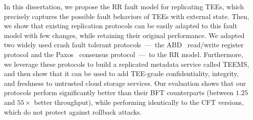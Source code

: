 \noindent In this dissertation, we propose the \acf{RR} fault
model for replicating \acp{TEE}, which precisely captures the possible
fault behaviors of \acp{TEE} with external state. Then, we show that
existing replication protocols can be easily adapted to this fault
model with few changes, while retaining their original performance.
We adapted two widely used crash fault tolerant protocols~---~the
\acs{ABD}~\cite{abd} read/write register protocol and the Paxos~\cite{paxos}
consensus protocol~---~to the \ac{RR} model.  Furthermore, we
leverage these protocols to build a replicated metadata service called
\ac{TEEMS}, and then show that it can be used to add \ac{TEE}-grade
confidentiality, integrity, and freshness to untrusted cloud storage
services.  Our evaluation shows that our protocols perform
significantly better than their BFT counterparts (between $1.25$ and
$55\times$ better throughput), while performing identically to
the \ac{CFT} versions, which do not protect against rollback attacks.

